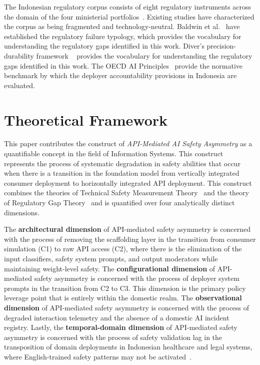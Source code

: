 \documentclass[conference]{IEEEtran}
\begin{document}
The Indonesian regulatory corpus consists of eight regulatory instruments across the domain of the four ministerial portfolios~\cite{b9,b10,b11,b12,b13,b14,b15,b16}. Existing studies have characterized the corpus as being fragmented and technology-neutral. Baldwin et al.~\cite{b2} have established the regulatory failure typology, which provides the vocabulary for understanding the regulatory gaps identified in this work. Diver's precision-durability framework ~\cite{b8} provides the vocabulary for understanding the regulatory gaps identified in this work. The OECD AI Principles~\cite{b35} provide the normative benchmark by which the deployer accountability provisions in Indonesia are evaluated.

\section{Theoretical Framework}

This paper contributes the construct of \textit{API-Mediated AI Safety Asymmetry} as a quantifiable concept in the field of Information Systems. This construct represents the process of systematic degradation in safety abilities that occur when there is a transition in the foundation model from vertically integrated consumer deployment to horizontally integrated API deployment. This construct combines the theories of Technical Safety Measurement Theory~\cite{b1,b3} and the theory of Regulatory Gap Theory~\cite{b2,b8} and is quantified over four analytically distinct dimensions.

The \textbf{architectural dimension} of API-mediated safety asymmetry is concerned with the process of removing the scaffolding layer in the transition from consumer simulation (C1) to raw API access (C2), where there is the elimination of the input classifiers, safety system prompts, and output moderators while maintaining weight-level safety. The \textbf{configurational dimension} of API-mediated safety asymmetry is concerned with the process of deployer system prompts in the transition from C2 to C3. This dimension is the primary policy leverage point that is entirely within the domestic realm. The \textbf{observational dimension} of API-mediated safety asymmetry is concerned with the process of degraded interaction telemetry and the absence of a domestic AI incident registry. Lastly, the \textbf{temporal-domain dimension} of API-mediated safety asymmetry is concerned with the process of safety validation lag in the transposition of domain deployments in Indonesian healthcare and legal systems, where English-trained safety patterns may not be activated~\cite{b5}.
\end{document}
